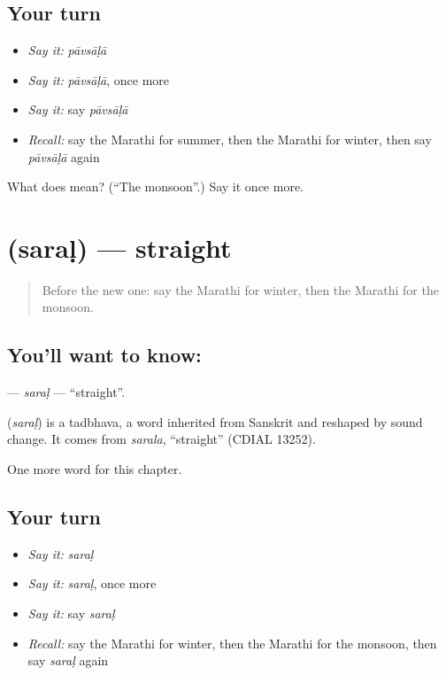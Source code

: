 \subsection*{Your turn}
\begin{itemize}
\raggedright
  \item \emph{Say it:} \emph{pāvsāḷā}
  \item \emph{Say it:} \emph{pāvsāḷā}, once more
  \item \emph{Say it:} say \emph{pāvsāḷā}
  \item \emph{Recall:} say the Marathi for summer, then the Marathi for winter, then say \emph{pāvsāḷā} again
\end{itemize}

\begin{tcolorbox}[breakable,colback=teal!4,colframe=teal!35!black,title={Before you move on}]
What does  mean? (\textquotedblleft{}The monsoon\textquotedblright{}.) Say it once more.
\end{tcolorbox}
\section[\texorpdfstring{\mr{सरळ} (saraḷ)}{सरळ (saraḷ)}]{ (saraḷ) — straight}

\label{lesson:MR-C127-saral}



\begin{quote}
Before the new one: say the Marathi for winter, then the Marathi for the monsoon.
\end{quote}

\subsection*{You'll want to know: }
\textbf{} — \emph{saraḷ} — \textquotedblleft{}straight\textquotedblright{}.

\begin{cousinweb}
\textbf{} (\emph{saraḷ}) is a tadbhava, a word inherited from Sanskrit and reshaped by sound change. It comes from \emph{sarala}, \textquotedblleft{}straight\textquotedblright{} (CDIAL 13252).
\end{cousinweb}

\begin{grammarlens}[title={What you've built}]
One more word for this chapter.
\end{grammarlens}

\subsection*{Your turn}
\begin{itemize}
\raggedright
  \item \emph{Say it:} \emph{saraḷ}
  \item \emph{Say it:} \emph{saraḷ}, once more
  \item \emph{Say it:} say \emph{saraḷ}
  \item \emph{Recall:} say the Marathi for winter, then the Marathi for the monsoon, then say \emph{saraḷ} again
\end{itemize}

